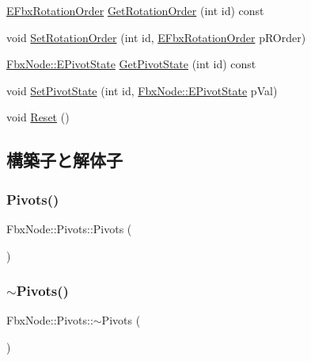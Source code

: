 \begin{DoxyCompactItemize}
\item 
\hyperlink{fbxmath_8h_ae46778666b56bb0abe5992b855fe9332}{E\+Fbx\+Rotation\+Order} \hyperlink{class_fbx_node_1_1_pivots_aab5f5f87a4eb865eeee4c232918677ef}{Get\+Rotation\+Order} (int id) const
\item 
void \hyperlink{class_fbx_node_1_1_pivots_a7f0f5d29498e70ed840a70c16cff355d}{Set\+Rotation\+Order} (int id, \hyperlink{fbxmath_8h_ae46778666b56bb0abe5992b855fe9332}{E\+Fbx\+Rotation\+Order} p\+R\+Order)
\item 
\hyperlink{class_fbx_node_a153fc75958227fc6728a2233b630b58a}{Fbx\+Node\+::\+E\+Pivot\+State} \hyperlink{class_fbx_node_1_1_pivots_a70917508966d4f14357fe678e1024eae}{Get\+Pivot\+State} (int id) const
\item 
void \hyperlink{class_fbx_node_1_1_pivots_abb34f894cdbda44914d8e707d7d7b737}{Set\+Pivot\+State} (int id, \hyperlink{class_fbx_node_a153fc75958227fc6728a2233b630b58a}{Fbx\+Node\+::\+E\+Pivot\+State} p\+Val)
\item 
void \hyperlink{class_fbx_node_1_1_pivots_ac7d51e9cdd4b9c8a384e94b8d868800c}{Reset} ()
\end{DoxyCompactItemize}


\subsection{構築子と解体子}
\mbox{\label{class_fbx_node_1_1_pivots_a41cd73917c09aaffe0af873d4e9d86b8}} 
\subsubsection{\texorpdfstring{Pivots()}{Pivots()}}
{\footnotesize\ttfamily Fbx\+Node\+::\+Pivots\+::\+Pivots (\begin{DoxyParamCaption}{ }\end{DoxyParamCaption})}

\mbox{\label{class_fbx_node_1_1_pivots_af7ab98cdaa9503fdb570ff1cd0ec67a4}} 
\subsubsection{\texorpdfstring{$\sim$\+Pivots()}{~Pivots()}}
{\footnotesize\ttfamily Fbx\+Node\+::\+Pivots\+::$\sim$\+Pivots (\begin{DoxyParamCaption}{ }\end{DoxyParamCaption})}

